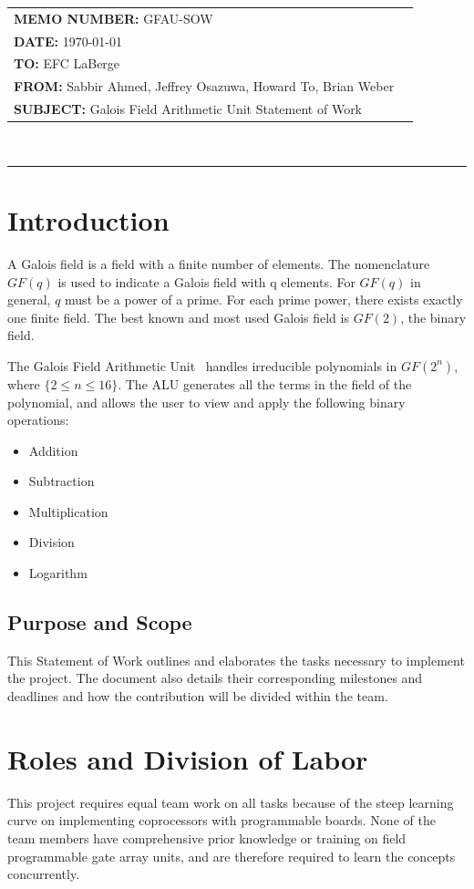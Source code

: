 \documentclass[paper=usletter, fontsize=12pt]{article}
\newcommand{\team}{Galois Field Arithmetic Unit}
\newcommand{\Sabbir}{Sabbir Ahmed}
\newcommand{\Jeffrey}{Jeffrey Osazuwa}
\newcommand{\Howard}{Howard To}
\newcommand{\Brian}{Brian Weber}
\newcommand{\documentinfo}[5]{
    \begin{centering}
        \parbox{6.8in}{
        \begin{spacing}{1}
            \begin{flushleft}
                \begin{tabular}{l l} #1 \\ #2 \\ #3 \\ #4 \\ #5 \\
                \end{tabular}\\
                \rule{\textwidth}{1pt}
            \end{flushleft}
        \end{spacing} }
    \end{centering} }
\begin{document}
    \documentinfo {\textbf{MEMO NUMBER:} GFAU-SOW} {\textbf{DATE:} {\today}}
    {\textbf{TO: } EFC LaBerge} {\textbf{FROM: }\Sabbir, \Jeffrey, \Howard,
    \Brian} {\textbf{SUBJECT: } Galois Field Arithmetic Unit Statement of Work}
    \vspace{-0.3in}

    \section{Introduction} A Galois field is a field with a finite number of
    elements. The nomenclature $GF(q)$ is used to indicate a Galois field with
    q elements. For $GF(q)$ in general, $q$ must be a power of a prime. For
    each prime power, there exists exactly one finite field. The best known and
    most used Galois field is $GF(2)$, the binary field.

    The \team~ handles irreducible polynomials in $GF(2^n)$, where $\{2 \leq n
    \leq 16\}$. The ALU generates all the terms in the field of the polynomial,
    and allows the user to view and apply the following binary operations:

    \begin{itemize}

        \item Addition
        \item Subtraction
        \item Multiplication
        \item Division
        \item Logarithm

    \end{itemize}

        \subsection{Purpose and Scope} This Statement of Work outlines and
        elaborates the tasks necessary to implement the project. The document
        also details their corresponding milestones and deadlines and how the
        contribution will be divided within the team.

    \section{Roles and Division of Labor} This project requires equal team work
on all tasks because of the steep learning curve on implementing coprocessors
with programmable boards. None of the team members have comprehensive prior
knowledge or training on field programmable gate array units, and are therefore
required to learn the concepts concurrently.
\end{document}
